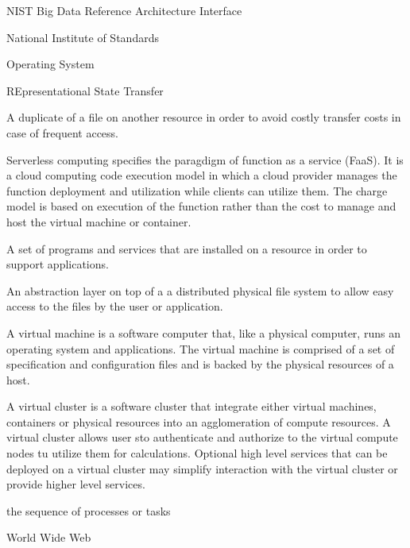 \documentclass[10pt]{article}
\begin{document}
\begin{description}[leftmargin=8em,style=nextline]
\item[NBDRAI] 	       NIST Big Data Reference Architecture Interface

\item[NIST] 	       National Institute of Standards

\item[OS] 	       Operating System

\item[REST] 	       REpresentational State Transfer

\item[Replica] A duplicate of a file on another resource in
  order to avoid costly transfer costs in case of frequent access.

\item[Serverless Computing] Serverless computing specifies the
  paragdigm of function as a service (FaaS). It is a cloud computing
  code execution model in which a cloud provider manages the function
  deployment and utilization while clients can utilize them. The
  charge model is based on execution of the function rather than the
  cost to manage and host the virtual machine or container.

\item[Software Stack] A set of programs and services that are
  installed on a resource in order to support applications.

\item[Virtual Filesysyem] An abstraction layer on top of a 
  a distributed physical file system to allow easy access to the files
  by the user or application.

\item[Virtual Machine] A virtual machine is a software computer that,
  like a physical computer, runs an operating system and applications.
  The virtual machine is comprised of a set of specification and
  configuration files and is backed by the physical resources of a
  host.

\item[Virtual Cluster] A virtual cluster is a software cluster that
  integrate either virtual machines, containers or physical resources into an
  agglomeration of compute resources. A virtual cluster allows user
  sto authenticate and authorize to the virtual compute nodes tu
  utilize them for calculations. Optional high level services that can
  be deployed on a virtual cluster may simplify
  interaction with the virtual cluster or provide higher level
  services. 

\item[Workflow] the sequence of processes or tasks

\item[WWW] World Wide Web

\end{description}
\end{document}
